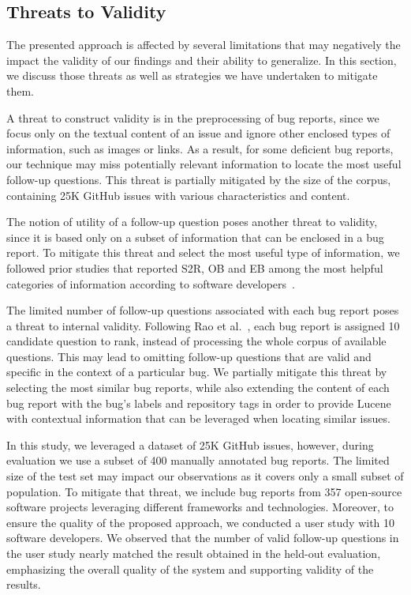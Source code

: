 \subsection{Threats to Validity}
The presented approach is affected by several limitations that may negatively the impact the validity of our findings and their ability to generalize. In this section, we discuss those threats as well as strategies we have undertaken to mitigate them.

A threat to construct validity is in the preprocessing of bug reports, since we focus only on the textual content of an issue and ignore other enclosed types of information, such as images or links. As a result, for some deficient bug reports, our technique may miss potentially relevant information to locate the most useful follow-up questions. This threat is partially mitigated by the size of the corpus, containing 25K GitHub issues with various characteristics and content.

The notion of utility of a follow-up question poses another threat to validity, since it is based only on a subset of information that can be enclosed in a bug report. To mitigate this threat and select the most useful type of information, we followed prior studies that reported S2R, OB and EB among the most helpful categories of information according to software developers~\cite{Zimmermann2010}.



The limited number of follow-up questions associated with each bug report poses a threat to internal validity. Following Rao et al.~\cite{rao-daume-iii-2018-learning}, each bug report is assigned 10 candidate question to rank, instead of processing the whole corpus of available questions. This  may lead to omitting follow-up questions that are valid and specific in the context of a particular bug. We partially mitigate this threat by selecting the most similar bug reports, while also extending the content of each bug report with the bug's labels and repository tags in order to provide Lucene with contextual information that can be leveraged when locating similar issues.


In this study, we leveraged a dataset of 25K GitHub issues, however, during evaluation we use a subset of 400 manually annotated bug reports. The limited size of the test set may impact our observations as it covers only a small subset of population. To mitigate that threat, we include bug reports from 357 open-source software projects leveraging different frameworks and technologies. Moreover, to ensure the quality of the proposed approach, we conducted a user study with 10 software developers. We observed that the number of valid follow-up questions in the user study nearly matched the result obtained in the held-out evaluation, emphasizing the overall quality of the system and supporting validity of the results.

